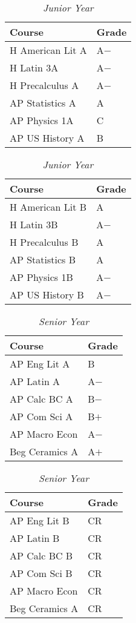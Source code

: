 \documentclass[12pt]{article}
\renewcommand{\it}[1]{\textit{{#1}}}
\begin{document}
\begin{table}[H]
  \centering
  \caption*{\it{Junior Year}}
  \vspace{-0.8em}
  \begin{tabular}{l|l}
    Course           & Grade \\
    \hline
    H American Lit A & A$-$ \\
    H Latin 3A       & A$-$ \\
    H Precalculus A  & A$-$ \\
    AP Statistics A  & A  \\
    AP Physics 1A    & C  \\
    AP US History A  & B  \\
  \end{tabular}
  \hspace{2em}
  \begin{tabular}{l|l}
    Course       & Grade \\
    \hline
    H American Lit B & A   \\
    H Latin 3B       & A$-$  \\
    H Precalculus B  & A   \\
    AP Statistics B  & A   \\
    AP Physics 1B    & A$-$  \\
    AP US History B  & A$-$  \\
  \end{tabular}
  \vspace{-1em}
\end{table}

\begin{table}[H]
  \centering
  \caption*{\it{Senior Year}}
  \vspace{-0.8em}
  \begin{tabular}{l|l}
    Course       & Grade \\
    \hline
    AP Eng Lit A   & B   \\
    AP Latin A     & A$-$  \\
    AP Calc BC A   & B$-$  \\
    AP Com Sci A   & B$+$  \\
    AP Macro Econ  & A$-$  \\
    Beg Ceramics A & A$+$  \\
  \end{tabular}
  \hspace{2em}
  \begin{tabular}{l|l}
    Course       & Grade \\
    \hline
    AP Eng Lit B   & CR  \\
    AP Latin B     & CR  \\
    AP Calc BC B   & CR  \\
    AP Com Sci B   & CR  \\
    AP Macro Econ  & CR  \\
    Beg Ceramics A & CR  \\
  \end{tabular}
\end{table}
\newpage
\end{document}
